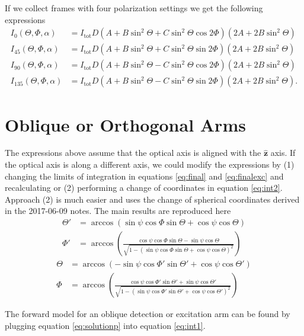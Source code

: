 \documentclass[11pt]{article}
\providecommand{\mh}[1]{\mathbf{\hat{#1}}}
\begin{document}
If we collect frames with four polarization settings we get the following expressions
\begin{subequations}
\begin{align}
  I_{0}(\Theta, \Phi, \alpha) &= I_{\text{tot}}D(A + B\sin^{2}{\Theta} + C\sin^{2}{\Theta} \cos{2 \Phi})(2A + 2B\sin^2\Theta)\\
  I_{45}(\Theta, \Phi, \alpha) &= I_{\text{tot}}D(A + B\sin^{2}{\Theta} + C\sin^{2}{\Theta} \sin{2 \Phi})(2A + 2B\sin^2\Theta)\\
  I_{90}(\Theta, \Phi, \alpha) &= I_{\text{tot}}D(A + B\sin^{2}{\Theta} - C\sin^{2}{\Theta} \cos{2 \Phi})(2A + 2B\sin^2\Theta)\\
  I_{135}(\Theta, \Phi, \alpha) &= I_{\text{tot}}D(A + B\sin^{2}{\Theta} - C\sin^{2}{\Theta} \sin{2 \Phi})(2A + 2B\sin^2\Theta).
\end{align}\label{eq:int1}
\end{subequations}

\section{Oblique or Orthogonal Arms}
The expressions above assume that the optical axis is aligned with the $\mh{z}$
axis. If the optical axis is along a different axis, we could modify the
expressions by (1) changing the limits of integration in equations
\ref{eq:final} and \ref{eq:finalexc} and recalculating or (2) performing a
change of coordinates in equation \ref{eq:int2}. Approach (2) is much easier and
uses the change of spherical coordinates derived in the 2017-06-09 notes. The
main results are reproduced here
\begin{subequations}
\begin{align}
  \Theta' &= \arccos\left(\sin\psi\cos\Phi\sin\Theta + \cos\psi\cos\Theta\right)\label{eq:thetap}\\
  \Phi' &= \arccos\left(\frac{\cos\psi\cos\Phi\sin\Theta - \sin\psi\cos\Theta}{\sqrt{1 - (\sin\psi\cos\Phi\sin\Theta + \cos\psi\cos\Theta)^2}}\right)\label{eq:phip}
\end{align}\label{eq:solution}%
\end{subequations}
\begin{subequations}
\begin{align}
  \Theta &= \arccos\left(-\sin\psi\cos\Phi'\sin\Theta' + \cos\psi\cos\Theta'\right)\\
  \Phi &= \arccos\left(\frac{\cos\psi\cos\Phi'\sin\Theta' + \sin\psi\cos\Theta'}{\sqrt{1 - (\sin\psi\cos\Phi'\sin\Theta' + \cos\psi\cos\Theta')^2}}\right)
\end{align}\label{eq:solutionp}%
\end{subequations}

The forward model for an oblique detection or excitation arm can be found by plugging
equation \ref{eq:solutionp} into equation \ref{eq:int1}.
\end{document}
